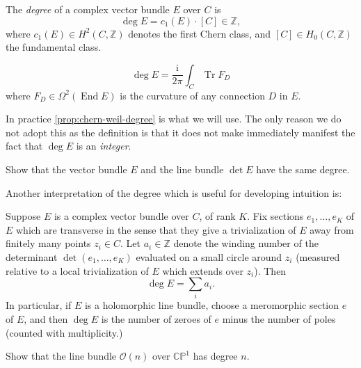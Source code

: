 \documentclass[12pt,letterpaper,reqno]{article}
\numberwithin{equation}{section}
\newcommand{\cO}{\ensuremath{\mathcal O}}
\newcommand{\C}{\ensuremath{\mathbb C}}
\newcommand{\PP}{\ensuremath{\mathbb P}}
\newcommand{\Z}{\ensuremath{\mathbb Z}}
\newcommand{\I}{{\mathrm i}}
\newcommand{\ti}[1]{\textit{#1}}
\DeclareMathOperator{\Tr}{Tr}
\DeclareMathOperator{\End}{End}
\begin{document}
\begin{defn} The \ti{degree} of a
complex vector bundle $E$ over $C$ is
\begin{equation}
  \deg E = c_1(E) \cdot [C] \in \Z,
\end{equation}
where $c_1(E) \in H^2(C,\Z)$ denotes the first Chern class,
and $[C] \in H_0(C,\Z)$ the fundamental class.
\end{defn}

\begin{prop} \label{prop:chern-weil-degree}
\begin{equation}
  \deg E = \frac{\I}{2 \pi} \int_C \Tr F_D
\end{equation}
where $F_D \in \Omega^2(\End E)$ is the curvature of any
connection $D$ in $E$.
\end{prop}

In practice \autoref{prop:chern-weil-degree} is what we will use.
The only reason we do not adopt this as the definition is that
it does not make immediately manifest the fact that $\deg E$ is an
\ti{integer}.

\begin{exercise} Show that the vector bundle $E$ and the line bundle $\det E$
have the same degree.
\end{exercise}

Another interpretation of the degree which is useful for developing
intuition is:
\begin{prop} Suppose $E$ is a complex vector bundle over $C$, of rank $K$.
Fix sections $e_1, \dots, e_K$ of $E$ which are transverse in the sense
that they give a trivialization of $E$ away from finitely many points
$z_i \in C$. Let $a_i \in \Z$ denote the winding
number of the determinant $\det(e_1, \dots, e_K)$ evaluated
on a small circle around $z_i$ (measured relative to a local trivialization
of $E$ which extends over $z_i$). Then
\begin{equation}
  \deg E = \sum_i a_i.
\end{equation}
In particular, if $E$ is a holomorphic line bundle, choose a meromorphic
section $e$ of $E$, and then $\deg E$ is the number of zeroes of $e$
minus the number of poles (counted with multiplicity.)
\end{prop}

\begin{exercise} Show that the line bundle $\cO(n)$ over $\C\PP^1$
has degree $n$.
\end{exercise}
\end{document}
